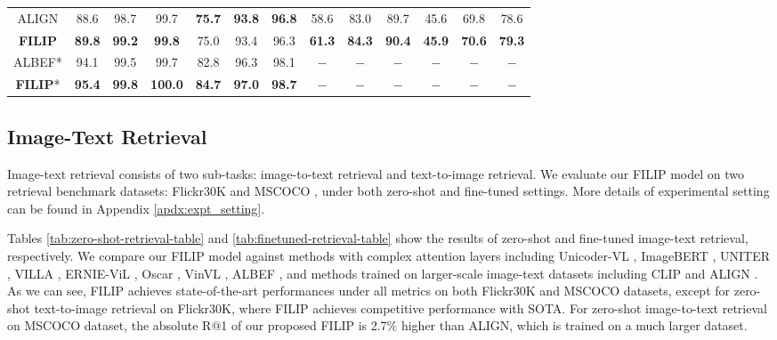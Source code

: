 \begin{table}
{\begin{tabular}{ccccccccccccc}
ALIGN       & 88.6          & 98.7          & 99.7         & \textbf{75.7}          & \textbf{93.8}          & \textbf{96.8}         & 58.6          & 83.0            & 89.7         & 45.6          & 69.8          & 78.6         \\
\textbf{FILIP}      & \textbf{89.8}          & \textbf{99.2}          & \textbf{99.8}         & {75.0}            & {93.4}          & {96.3}         & \textbf{61.3}          & \textbf{84.3}          & \textbf{90.4}         & \textbf{45.9}          & \textbf{70.6}          & \textbf{79.3}         \\ \hline
ALBEF*       & 94.1          & 99.5          & 99.7         & 82.8          & 96.3          & 98.1         & $-$             & $-$             & $-$            & $-$             & $-$             & $-$            \\
\textbf{FILIP}*       & \textbf{95.4}          & \textbf{99.8}          & \textbf{100.0}         & \textbf{84.7}            & \textbf{97.0}          & \textbf{98.7}         & $-$             & $-$             & $-$            & $-$             & $-$             & $-$            \\
\bottomrule         
\end{tabular}}
\vspace{-3mm}
\end{table}



\vspace{-1mm}
\subsection{Image-Text Retrieval}
\label{sec:image_text_retrieval}
Image-text retrieval consists of two sub-tasks: image-to-text retrieval and text-to-image retrieval. 
We evaluate our FILIP model on two retrieval benchmark datasets: Flickr30K \citep{dataset_flickr30k} and MSCOCO \citep{dataset_mscoco}, under both zero-shot and fine-tuned settings. 
More details of experimental setting can be found in Appendix \ref{apdx:expt_setting}.

Tables \ref{tab:zero-shot-retrieval-table} and  \ref{tab:finetuned-retrieval-table} show the results of 
zero-shot and fine-tuned 
image-text retrieval,
respectively. We compare our FILIP model against methods with complex attention layers including Unicoder-VL \citep{unicoder_vl}, ImageBERT \citep{imagebert}, UNITER \citep{chen2020uniter}, VILLA \citep{villa}, ERNIE-ViL \citep{ernie_vil}, Oscar \citep{li2020oscar}, VinVL \citep{zhang2021vinvl}, ALBEF \citep{li2021align}, and methods trained on larger-scale image-text datasets including CLIP \citep{radford2021learning} and ALIGN \citep{jia2021scaling}. As we can see, FILIP achieves state-of-the-art performances under all metrics on both Flickr30K and MSCOCO datasets, except for zero-shot text-to-image retrieval on Flickr30K, where FILIP achieves competitive performance with SOTA. For zero-shot image-to-text retrieval on MSCOCO dataset, the absolute R@1 of our proposed FILIP is 2.7\% higher than ALIGN, which is trained on a much larger dataset.


